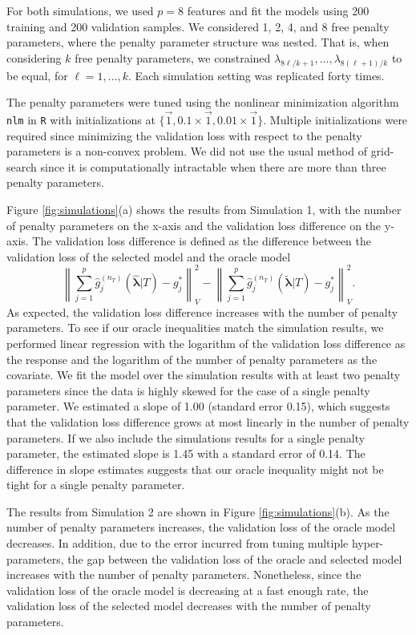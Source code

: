 \documentclass[12pt]{article}
\begin{document}
For both simulations, we used $p = 8$ features and fit the models using 200 training and 200 validation samples. We considered 1, 2, 4, and 8 free penalty parameters, where the penalty parameter structure was nested. That is, when considering $k$ free penalty parameters, we constrained $\lambda_{8\ell/k + 1}, ...,  \lambda_{8(\ell + 1)/k}$ to be equal, for $\ell= 1,...,k$. Each simulation setting was replicated forty times.

The penalty parameters were tuned using the nonlinear minimization algorithm \texttt{nlm} in \texttt{R} with initializations at $\{\vec{1}, 0.1 \times \vec{1}, 0.01 \times \vec{1}\}$. 
Multiple initializations were required since minimizing the validation loss with respect to the penalty parameters is a non-convex problem.
We did not use the usual method of grid-search since it is computationally intractable when there are more than three penalty parameters.

Figure \ref{fig:simulations}(a) shows the results from Simulation 1, with the number of penalty parameters on the x-axis and the validation loss difference on the y-axis. The validation loss difference is defined as the difference between the validation loss of the selected model and the oracle model
$$
\left \| \sum_{j=1}^p \hat{g}^{(n_T)}_j(\hat{\boldsymbol{\lambda}}|T) - g^*_j \right \|_V^2 - 
\left \| \sum_{j=1}^p \hat{g}^{(n_T)}_j(\tilde{\boldsymbol{\lambda}} | T) - g^*_j \right \|_V^2.
$$
As expected, the validation loss difference increases with the number of penalty parameters.
To see if our oracle inequalities match the simulation results, we performed linear regression with the logarithm of the validation loss difference as the response and the logarithm of the number of penalty parameters as the covariate. 
We fit the model over the simulation results with at least two penalty parameters since the data is highly skewed for the case of a single penalty parameter. 
We estimated a slope of 1.00 (standard error 0.15), which suggests that the validation loss difference grows at most linearly in the number of penalty parameters. 
If we also include the simulations results for a single penalty parameter, the estimated slope is 1.45 with a standard error of 0.14. The difference in slope estimates suggests that our oracle inequality might not be tight for a single penalty parameter.

The results from Simulation 2 are shown in Figure \ref{fig:simulations}(b). As the number of penalty parameters increases, the validation loss of the oracle model decreases. In addition, due to the error incurred from tuning multiple hyper-parameters, the gap between the validation loss of the oracle and selected model increases with the number of penalty parameters. Nonetheless, since the validation loss of the oracle model is decreasing at a fast enough rate, the validation loss of the selected model decreases with the number of penalty parameters.
\end{document}
